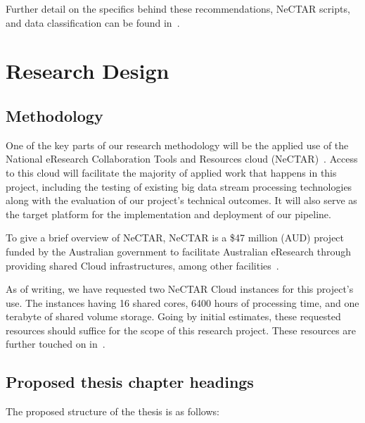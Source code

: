 \documentclass[a4paper,11pt]{article}
\begin{document}
Further detail on the specifics behind these recommendations, NeCTAR scripts, and data classification can be found in~.





\section{Research Design} %
\label{sec:research_design}

\subsection{Methodology} %
\label{sub:methodology}

One of the key parts of our research methodology will be the applied use of the National eResearch Collaboration Tools and Resources cloud (NeCTAR)~\cite{web:Nectar}. Access to this cloud will facilitate the majority of applied work that happens in this project, including the testing of existing big data stream processing technologies along with the evaluation of our project's technical outcomes. It will also serve as the target platform for the implementation and deployment of our pipeline.

To give a brief overview of NeCTAR, NeCTAR is a \$47 million (AUD) project funded by the Australian government to facilitate Australian eResearch through providing shared Cloud infrastructures, among other facilities~\cite{sinnott_towards_2011}.

As of writing, we have requested two NeCTAR Cloud instances for this project's use. The instances having 16 shared cores, 6400 hours of processing time, and one terabyte of shared volume storage. Going by initial estimates, these requested resources should suffice for the scope of this research project. These resources are further touched on in~.


\subsection{Proposed thesis chapter headings} %
\label{sub:proposed_thesis_chapter_headings}

The proposed structure of the thesis is as follows:
\end{document}
